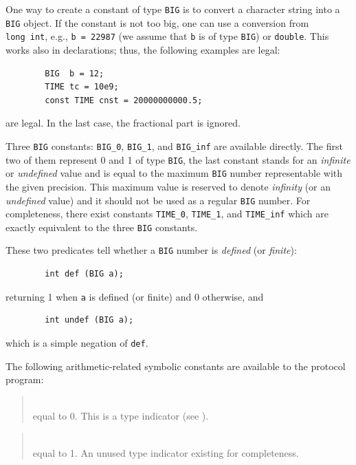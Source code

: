 One way to create a constant of type {\tt BIG} is to convert a
character string into a {\tt BIG} object.
If the constant is not too big,
one can use a conversion from {\tt long~int}, e.g.,
{\tt b~=~22987} (we assume that {\tt b} is of type {\tt BIG})
or {\tt double}.
This works also in declarations; thus, the following examples are legal:
\begin{verbatim}
        BIG  b = 12;
        TIME tc = 10e9;
        const TIME cnst = 20000000000.5;
\end{verbatim}
are legal.
In the last case, the fractional part is ignored.

Three {\tt BIG} constants:
{\tt BIG\_0}, {\tt BIG\_1}, and {\tt BIG\_inf} are available directly.
The first two of them represent 0 and 1 of type {\tt BIG}, the last
constant stands for an {\em infinite\/} or {\em undefined\/} value and is
equal to the maximum {\tt BIG} number representable with the given
precision.
This maximum value is reserved to denote {\em infinity\/} (or an
{\em undefined\/} value) and it should not
be used as a regular {\tt BIG} number.
For completeness, there exist constants {\tt TIME\_0}, {\tt TIME\_1}, and
{\tt TIME\_inf} which are exactly equivalent to the three {\tt BIG}
constants.

These two predicates tell whether a {\tt BIG} number is {\em defined\/}
(or {\em finite\/}):
\begin{verbatim}
        int def (BIG a);
\end{verbatim}
returning 1 when {\tt a} is defined (or finite) and 0 otherwise, and
\begin{verbatim}
        int undef (BIG a);
\end{verbatim}
which is a simple negation of {\tt def}.

The following arithmetic-related symbolic constants are available to the
protocol program:

\medskip

\begin{quote}
\noindent{}\\ \hspace{0in}
equal to 0.
This is a type indicator (see ).
\end{quote}

\begin{quote}
\noindent{}\\ \hspace{0in}
equal to 1.
An unused type indicator existing for completeness.
\end{quote}

